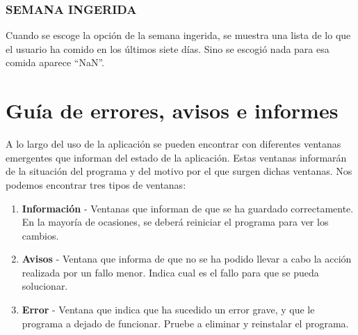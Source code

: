 \subsubsection{SEMANA INGERIDA}
Cuando se escoge la opción de la semana ingerida, se muestra una lista de lo que el usuario ha comido en los últimos siete días. Sino se escogió nada para esa comida aparece “NaN”.
\section{Guía de errores, avisos e informes}
A lo largo del uso de la aplicación se pueden encontrar con diferentes ventanas emergentes que informan del estado de la aplicación. Estas ventanas informarán de la situación del programa y del motivo por el que surgen dichas ventanas.
Nos podemos encontrar tres tipos de ventanas:
\begin{enumerate}
\item \textbf{Información} - Ventanas que informan de que se ha guardado correctamente. En la mayoría de ocasiones, se deberá reiniciar el programa para ver los cambios.
\item \textbf{Avisos} - Ventana que informa de que no se ha podido llevar a cabo la acción realizada por un fallo menor. Indica cual es el fallo para que se pueda solucionar.
\item \textbf{Error} - Ventana que indica que ha sucedido un error grave, y que le programa a dejado de funcionar. Pruebe a eliminar y reinstalar el programa.
\end{enumerate}